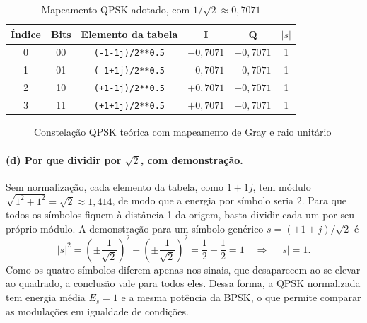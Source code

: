 \begin{table}[H]
\centering\small
\caption{Mapeamento QPSK adotado, com $1/\sqrt2\approx 0{,}7071$}\label{tab:qpsk}
\begin{tabular}{@{}cccccc@{}}
\toprule
\textbf{Índice} & \textbf{Bits} & \textbf{Elemento da tabela} & \textbf{I} & \textbf{Q} & \textbf{$|s|$}\\
\midrule
0 & 00 & \texttt{(-1-1j)/2**0.5} & $-0{,}7071$ & $-0{,}7071$ & 1\\
1 & 01 & \texttt{(-1+1j)/2**0.5} & $-0{,}7071$ & $+0{,}7071$ & 1\\
2 & 10 & \texttt{(+1-1j)/2**0.5} & $+0{,}7071$ & $-0{,}7071$ & 1\\
3 & 11 & \texttt{(+1+1j)/2**0.5} & $+0{,}7071$ & $+0{,}7071$ & 1\\
\bottomrule
\end{tabular}
\end{table}

\begin{figure}[H]
\centering
{}
\caption{Constelação QPSK teórica com mapeamento de Gray e raio unitário}\label{fig:qpsk-teo}
\end{figure}

\paragraph{(d) Por que dividir por $\sqrt2$, com demonstração.} Sem normalização, cada elemento da tabela, como $1+1j$, tem módulo $\sqrt{1^2+1^2}=\sqrt2\approx1{,}414$, de modo que a energia por símbolo seria 2. Para que todos os símbolos fiquem à distância 1 da origem, basta dividir cada um por seu próprio módulo. A demonstração para um símbolo genérico $s=(\pm1\pm j)/\sqrt2$ é
\begin{equation}
|s|^2=\left(\pm\frac{1}{\sqrt2}\right)^2+\left(\pm\frac{1}{\sqrt2}\right)^2=\frac12+\frac12=1
\quad\Rightarrow\quad |s|=1.
\end{equation}
Como os quatro símbolos diferem apenas nos sinais, que desaparecem ao se elevar ao quadrado, a conclusão vale para todos eles. Dessa forma, a QPSK normalizada tem energia média $E_s=1$ e a mesma potência da BPSK, o que permite comparar as modulações em igualdade de condições.

